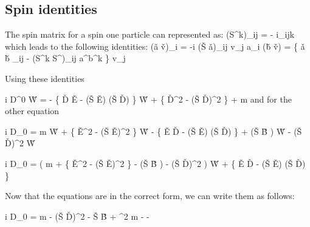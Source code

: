 \subsection{Spin identities}

The spin matrix for a spin one particle can represented as:
\beq
	(S^k)_{ij} = - i\epsilon_{ijk}
\eeq
which leads to the following identities:
\beq
	(\v{a} \times \v{v})_i = -i (\v{S} \cdot \v{a})_{ij} v_j
\eeq
\beq
	a_i (\v{b} \cdot \v{v}) = \{ \v{a} \cdot \v{b} \; \delta_{ij} - (S^k S^\ell)_{ij} a^\ell b^k \} v_j
\eeq

Using these identities


\beq
	i D^0 \v{W} = 
		- \{ \v{D} \cdot \v{E} - (\v{S} \cdot \v{E}) (\v{S} \cdot \v{D})	\} \v{W}
		+ \{ \v{D}^2 -  (\v{S} \cdot \v{D})^2 \} \gv{\eta} + m \gv{\eta}
\eeq
and for the other equation

\beq
	i D_0 \gv{\eta} = m \v{W} 
			+  \{ \v{E}^2 - (\v{S} \cdot \v{E})^2 \} \v{W}
			- \{ \v{E} \cdot \v{D} - (\v{S} \cdot \v{E}) (\v{S} \cdot \v{D}) \} \gv{\eta}
			+  (\v{S} \cdot \v{B} ) \v{W}
			 -  (\v{S} \cdot \v{D})^2  \v{W}  
\eeq

\beq
	i D_0 \gv{\eta} = \left(
				m 
				+  \{ \v{E}^2 - (\v{S} \cdot \v{E})^2 \} 
				-  (\v{S} \cdot \v{B} )
				-  (\v{S} \cdot \v{D})^2 
			\right ) \v{W} 
			+ \{ \v{E} \cdot \v{D} - (\v{S} \cdot \v{E}) (\v{S} \cdot \v{D}) \} \gv{\eta}  
\eeq

Now that the equations are in the correct form, we can write them as follows:



\beq \label{eq:S1:M}
i D_0  = 
	\Mblock
	{ \lambda {}  }
		{m
	- (\v{S} \cdot \v{D})^2 
	- \lambda {} \v{S} \cdot \v{B}
	+ \lambda^2    }
	{ m
	-   }
	{ - \lambda {}   } 
\eeq

